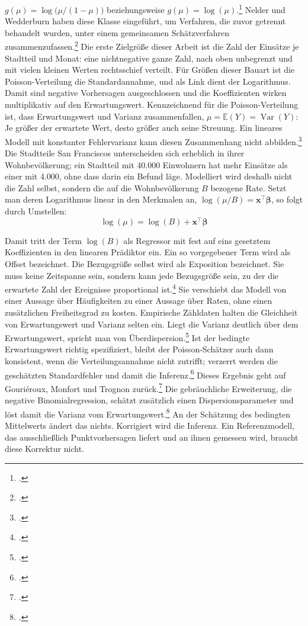 \documentclass[12pt,a4paper]{article}
\newcommand{\formeleintrag}[1]{%
  \addcontentsline{equ}{formeln}{\protect\numberline{\theequation}#1}}
\begin{document}
$g(\mu)=\log\bigl(\mu/(1-\mu)\bigr)$ beziehungsweise $g(\mu)=\log(\mu)$.\footcite[173]{James2023} Nelder und Wedderburn haben diese
Klasse eingeführt, um Verfahren, die zuvor getrennt behandelt wurden, unter einem gemeinsamen
Schätzverfahren zusammenzufassen.\footcite[370, 372]{Nelder1972}
Die erste Zielgröße dieser Arbeit ist die Zahl der Einsätze je Stadtteil und Monat: eine nichtnegative ganze Zahl, nach oben unbegrenzt und mit vielen kleinen Werten rechtsschief verteilt. Für Größen dieser Bauart ist die Poisson-Verteilung die Standardannahme, und als Link dient der Logarithmus. Damit sind negative Vorhersagen ausgeschlossen und die
Koeffizienten wirken multiplikativ auf den Erwartungswert. Kennzeichnend für die Poisson-Verteilung
ist, dass Erwartungswert und Varianz zusammenfallen, $\mu = \mathbb{E}(Y) = \operatorname{Var}(Y)$:
Je größer der erwartete Wert, desto größer auch seine Streuung. Ein lineares Modell mit konstanter
Fehlervarianz kann diesen Zusammenhang nicht abbilden.\footcite[168-170]{James2023}
Die Stadtteile San Franciscos unterscheiden sich erheblich in ihrer Wohnbevölkerung; ein Stadtteil mit
40.000 Einwohnern hat mehr Einsätze als einer mit 4.000, ohne dass darin ein Befund läge. Modelliert
wird deshalb nicht die Zahl selbst, sondern die auf die Wohnbevölkerung $B$ bezogene Rate. Setzt man
deren Logarithmus linear in den Merkmalen an, $\log(\mu/B) = \mathbf{x}^{\top}\boldsymbol{\beta}$, so
folgt durch Umstellen:
\begin{equation}
  \log(\mu) = \log(B) + \mathbf{x}^{\top}\boldsymbol{\beta}
\end{equation}
\formeleintrag{Poisson-Regression mit Offset für die Exposition}
Damit tritt der Term $\log(B)$ als Regressor mit fest auf eins gesetztem Koeffizienten in den linearen Prädiktor ein. Ein so vorgegebener Term wird als Offset bezeichnet. Die Bezugsgröße selbst wird als Exposition bezeichnet. Sie muss keine Zeitspanne sein, sondern kann jede Bezugsgröße sein, zu der die erwartete Zahl der Ereignisse proportional ist.\footcite[74-75]{Winkelmann2008} Sie verschiebt das Modell von einer Aussage über Häufigkeiten zu einer Aussage über Raten, ohne einen zusätzlichen Freiheitsgrad zu kosten.
Empirische Zähldaten halten die Gleichheit von Erwartungswert und Varianz selten ein. Liegt die
Varianz deutlich über dem Erwartungswert, spricht man von Überdispersion.\footcite[172]{James2023}
Ist der bedingte Erwartungswert richtig spezifiziert, bleibt der Poisson-Schätzer auch dann
konsistent, wenn die Verteilungsannahme nicht zutrifft; verzerrt werden die geschätzten Standardfehler
und damit die Inferenz.\footcite[89]{Winkelmann2008} Dieses Ergebnis geht auf Gouriéroux, Monfort
und Trognon zurück.\footcite[8]{Gourieroux1981} Die gebräuchliche Erweiterung, die negative Binomialregression, schätzt zusätzlich einen Dispersionsparameter und löst damit die Varianz vom Erwartungswert.\footcite[20-21]{Winkelmann2008} An der Schätzung des bedingten Mittelwerts ändert das nichts. Korrigiert wird die Inferenz. Ein Referenzmodell, das ausschließlich Punktvorhersagen liefert und an ihnen gemessen wird, braucht diese Korrektur nicht.
\end{document}
